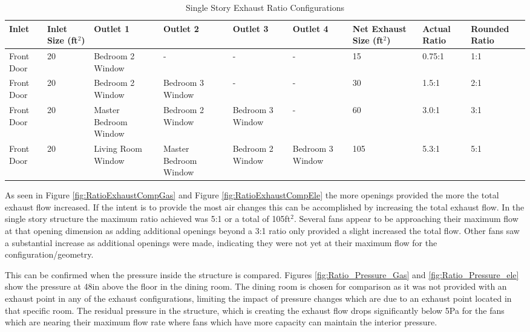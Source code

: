 \documentclass{article}
\begin{document}
\begin{table}[H]
	\centering
	\caption {Single Story Exhaust Ratio Configurations}
	\begin{tabular}{|C{.5in}|C{.6in}|C{.7in}|C{.7in}|C{.7in}|C{.7in}|C{.6in}|C{.5in}|C{.5in}|}
		\hline
		Inlet & Inlet Size (ft$^2$) & Outlet 1 & Outlet 2 & Outlet 3 & Outlet 4 & Net Exhaust Size (ft$^2$) & Actual Ratio & Rounded Ratio \\ \hline \hline
		Front Door & 20 & Bedroom 2 Window & - & - & - & 15 & 0.75:1 & 1:1 \\ \hline
		Front Door & 20 & Bedroom 2 Window & Bedroom 3 Window & - & - & 30 & 1.5:1 & 2:1 \\ \hline
		Front Door & 20 & Master Bedroom Window & Bedroom 2 Window & Bedroom 3 Window & - & 60 & 3.0:1 & 3:1 \\ \hline
		Front Door & 20 & Living Room Window & Master Bedroom Window & Bedroom 2 Window & Bedroom 3 Window & 105 & 5.3:1 & 5:1 \\ \hline
	\end{tabular}
	\label{table:RatioExhaustComp}
\end{table}

As seen in Figure \ref{fig:RatioExhaustCompGas} and Figure \ref{fig:RatioExhaustCompEle} the more openings provided the more the total exhaust flow increased. If the intent is to provide the most air changes this can be accomplished by increasing the total exhaust flow. In the single story structure the maximum ratio achieved was 5:1 or a total of 105ft$^2$. Several fans appear to be approaching their maximum flow at that opening dimension as adding additional openings beyond a 3:1 ratio only provided a slight increased the total flow. Other fans saw a substantial increase as additional openings were made, indicating they were not yet at their maximum flow for the configuration/geometry. 

This can be confirmed when the pressure inside the structure is compared. Figures \ref{fig:Ratio_Pressure_Gas} and \ref{fig:Ratio_Pressure_ele} show the pressure at 48in above the floor in the dining room. The dining room is chosen for comparison as it was not provided with an exhaust point in any of the exhaust configurations, limiting the impact of pressure changes which are due to an exhaust point located in that specific room. The residual pressure in the structure, which is creating the exhaust flow drops significantly below 5Pa for the fans which are nearing their maximum flow rate where fans which have more capacity can maintain the interior pressure. 
\end{document}
